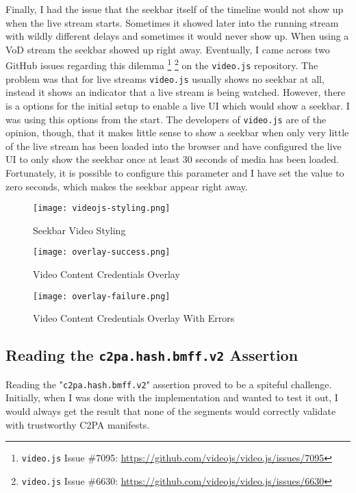 Finally, I had the issue that the seekbar itself of the timeline would not show up when the live stream starts. Sometimes it showed later into the running stream with wildly different delays and sometimes it would never show up. When using a VoD stream the seekbar showed up right away. Eventually, I came across two GitHub issues regarding this dilemma \footnote{\texttt{video.js} Issue \#7095: \url{https://github.com/videojs/video.js/issues/7095}} \footnote{\texttt{video.js} Issue \#6630: \url{https://github.com/videojs/video.js/issues/6630}} on the \texttt{video.js} repository. The problem was that for live streams \texttt{video.js} usually shows no seekbar at all, instead it shows an indicator that a live stream is being watched. However, there is a options for the initial setup to enable a live UI which would show a seekbar. I was using this options from the start. The developers of \texttt{video.js} are of the opinion, though, that it makes little sense to show a seekbar when only very little of the live stream has been loaded into the browser and have configured the live UI to only show the seekbar once at least 30 seconds of media has been loaded. Fortunately, it is possible to configure this parameter and I have set the value to zero seconds, which makes the seekbar appear right away.

\begin{figure}
    \texttt{[image: videojs-styling.png]}
    \caption{Seekbar Video Styling}
    \label{fig:seekbar}
\end{figure}
\begin{figure}
    \texttt{[image: overlay-success.png]}
    \caption{Video Content Credentials Overlay}
    \label{fig:overlay-success}
\end{figure}
\begin{figure}
    \texttt{[image: overlay-failure.png]}
    \caption{Video Content Credentials Overlay With Errors}
    \label{fig:overlay-failure}
\end{figure}

\subsection{Reading the \texttt{c2pa.hash.bmff.v2} Assertion}

Reading the "\texttt{c2pa.hash.bmff.v2}" assertion proved to be a spiteful challenge. Initially, when I was done with the implementation and wanted to test it out, I would always get the result that none of the segments would correctly validate with trustworthy C2PA manifests.

